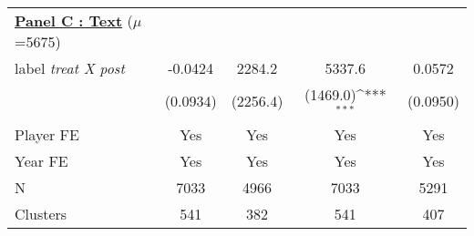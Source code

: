 {
\def\sym#1{\ifmmode^{#1}\else\(^{#1}\)\fi}
\begin{tabular*}{\hsize}{@{\hskip\tabcolsep\extracolsep\fill}l*{4}{c}}
\midrule \vspace{5mm} \underline{\textbf{Panel C : Text}}\hphantom{ations}\vspace{5mm} ($\mu$=5675)\\ label
\emph{treat X post}&     -0.0424         &      2284.2         &      5337.6         &      0.0572         \\
            &    (0.0934)         &    (2256.4)         &    (1469.0)\sym{***}&    (0.0950)         \\
\midrule
Player FE   &         Yes         &         Yes         &         Yes         &         Yes         \\
Year FE     &         Yes         &         Yes         &         Yes         &         Yes         \\
N           &        7033         &        4966         &        7033         &        5291         \\
Clusters    &         541         &         382         &         541         &         407         \\
\bottomrule
\end{tabular*}
}
